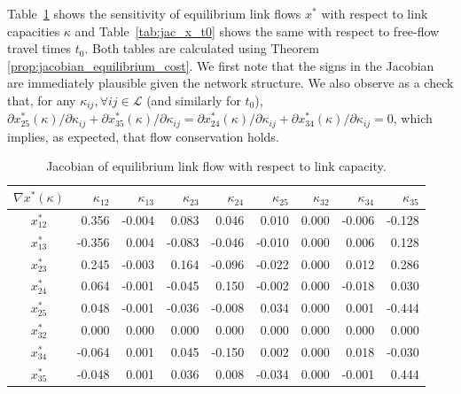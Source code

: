 \documentclass[a4paper,11pt]{article}
\begin{document}
Table~\ref{tab:jac_x_kappa} shows the sensitivity of equilibrium link flows $x^*$ with respect to link capacities $\kappa$ and Table~\ref{tab:jac_x_t0} shows the same with respect to free-flow travel times $t_0$. Both tables are calculated using Theorem \ref{prop:jacobian_equilibrium_cost}. We first note that the signs in the Jacobian are immediately plausible given the network structure. We also observe as a check that, for any $\kappa_{ij}, \forall ij \in \mathcal{L}$ (and similarly for $t_0$), $\partial x^*_{25}(\kappa)/\partial \kappa_{ij} + \partial x^*_{35}(\kappa)/\partial \kappa_{ij} = \partial x^*_{24}(\kappa)/\partial \kappa_{ij} + \partial x^*_{34}(\kappa)/\partial \kappa_{ij} = 0$, which implies, as expected, that flow conservation holds. 
\begin{table}[H]
\captionsetup{justification=centering}
\caption{Jacobian of equilibrium link flow with respect to link capacity.}\label{tab:jac_x_kappa}
\setlength\tabcolsep{8pt}
\centering
\begin{tabular}{crrrrrrrr}
 $\nabla x^*(\kappa)$ & $\kappa_{12}$ &  $\kappa_{13}$      & $\kappa_{23}$      & $\kappa_{24}$ &     $\kappa_{25}$      & $\kappa_{32}$     & $\kappa_{34}$      & $\kappa_{35}$      \\
\toprule
$x^*_{12}$                         & 0.356                 & -0.004 & 0.083  & 0.046  & 0.010  & 0.000 & -0.006 & -0.128 \\
$x^*_{13}$                         & -0.356                & 0.004  & -0.083 & -0.046 & -0.010 & 0.000 & 0.006  & 0.128  \\
$x^*_{2 3}$                         & 0.245                 & -0.003 & 0.164  & -0.096 & -0.022 & 0.000 & 0.012  & 0.286  \\
$x^*_{24}$                         & 0.064                 & -0.001 & -0.045 & 0.150  & -0.002 & 0.000 & -0.018 & 0.030  \\
$x^*_{25}$                         & 0.048                 & -0.001 & -0.036 & -0.008 & 0.034  & 0.000 & 0.001  & -0.444 \\
$x^*_{32}$                         & 0.000                 & 0.000  & 0.000  & 0.000  & 0.000  & 0.000 & 0.000  & 0.000  \\
$x^*_{3 4}$                         & -0.064                & 0.001  & 0.045  & -0.150 & 0.002  & 0.000 & 0.018  & -0.030 \\
$x^*_{35}$                         & -0.048                & 0.001  & 0.036  & 0.008  & -0.034 & 0.000 & -0.001 & 0.444 \\
\bottomrule
\end{tabular}
\end{table}
\end{document}
